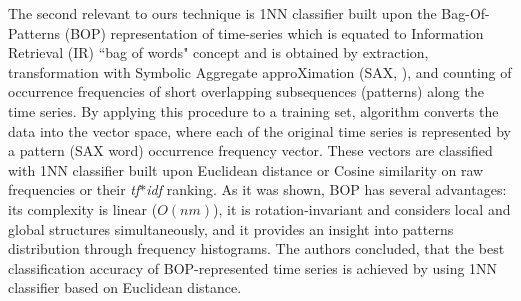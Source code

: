 \documentclass[conference]{IEEEtran}
\begin{document}
The second relevant to ours technique is 1NN classifier built upon the 
Bag-Of-Patterns (BOP) representation of time-series \cite{bag_patterns} 
which is equated to Information Retrieval (IR) ``bag of words" concept 
and is obtained by extraction, transformation with Symbolic Aggregate 
approXimation (SAX, \cite{sax}), 
and counting of occurrence frequencies of short overlapping 
subsequences (patterns) along the time series.
By applying this procedure to a training set, algorithm converts the data into 
the vector space, where each of the original time series is represented by a 
pattern (SAX word) occurrence frequency vector. 
These vectors are classified with 1NN classifier built upon Euclidean distance 
or Cosine similarity on raw frequencies or their \textit{tf$\ast$idf} ranking. 
As it was shown, BOP has several advantages: 
its complexity is linear ($O(nm)$), it is rotation-invariant and considers 
local and global structures simultaneously, 
and it provides an insight into patterns distribution through frequency histograms.
The authors concluded, that the best classification accuracy of BOP-represented 
time series is achieved by using 1NN classifier based on Euclidean distance.
\end{document}
